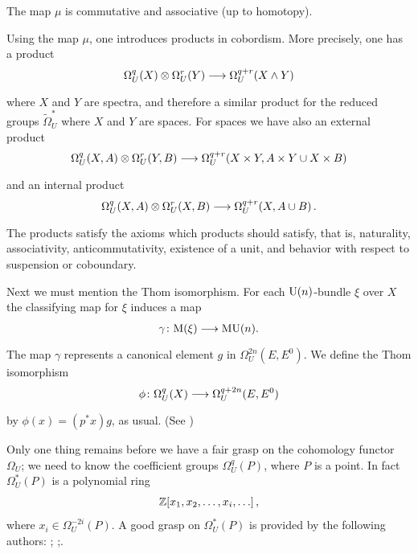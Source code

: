 \documentclass[../main]{subfiles}
\begin{document}
The map $\mu$ is commutative and associative (up to homotopy).

Using the map $\mu$, one introduces products in cobordism. 
More precisely, one has a product
\begin{equation*}
	\Omega_{U}^q(X) \otimes \Omega_{U}^r(Y) \lar{} \Omega_{U}^{q+r} (X \wedge Y)
\end{equation*}
where $X$ and $Y$ are spectra, and therefore a similar product for the reduced groups $\tilde{\Omega}^{\ast}_{U}$ where $X$ and $Y$ are spaces.
For spaces we have also an external product 
\begin{equation*}
  \Omega^{q}_{U}(X,A) \otimes \Omega^{r}_{U}(Y,B) \lar{} \Omega^{q+r}_{U}(X \times Y, A \times Y \cup X \times B)
\end{equation*}
and an internal product
\begin{equation*}
  \Omega^{q}_{U}(X,A) \otimes \Omega^{r}_{U}(X,B) \lar{} \Omega^{q+r}_{U}(X, A \cup  B )\, .
\end{equation*}
The products satisfy the axioms which products should satisfy, that is, naturality, associativity, anticommutativity, existence of a unit, and behavior with respect to suspension or coboundary.

Next we must mention the Thom isomorphism.
For each $\mathrm{U}(n)$-bundle $\xi$ over $X$ the classifying map for $\xi$ induces a map
\begin{equation*}
	\gamma\colon \te{M}(\xi) \lar{}  \te{MU}(n).
\end{equation*}
The map $\gamma$ represents a canonical element $g$ in $\Omega^{2n}_{U}(E,E^{0})$. 
We define the Thom isomorphism
\begin{equation*}
	\phi\colon  \Omega^{q}_{U}(X) \lar{} \Omega^{q+2n}_{U}(E,E^{0})
\end{equation*}
by $\phi(x) = (p^{\ast} x)g$, as usual.
(See \cite{Dold})

Only one thing remains before we have a fair grasp on the cohomology functor $\Omega^{}_{U}$; 
we need to know the coefficient groups $\Omega^{q}_{U}(P)$, where $P$ is a point. 
In fact $\Omega^{\ast}_{U}(P)$ is a polynomial ring
\begin{equation*}
	\mathbb{Z}[x_1,x_2,\ldots,x_{i},\ldots]\, ,
\end{equation*}
where $x_{i} \in \Omega^{-2i}_{U}(P)$. 
A good grasp on $\Omega^{\ast}_{U}(P)$ is provided by the following authors: \cite{milnor2}; 
\cite{stong};\cite{hattori}.
\end{document}
